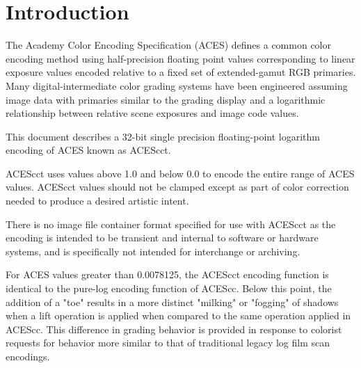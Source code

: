 \unnumberedformat	    %
\chapter{Introduction} 	%

The Academy Color Encoding Specification (ACES) defines a common color encoding method using half-precision floating point values corresponding to linear exposure values encoded relative to a fixed set of extended-gamut RGB primaries. Many digital-intermediate color grading systems have been engineered assuming image data with primaries similar to the grading display and a logarithmic relationship between relative scene exposures and image code values.

This document describes a 32-bit single precision floating-point logarithm encoding of ACES known as ACEScct.

ACEScct uses values above 1.0 and below 0.0 to encode the entire range of ACES values. ACEScct values should not be clamped except as part of color correction needed to produce a desired artistic intent.

There is no image file container format specified for use with ACEScct as the encoding is intended to be transient and internal to software or hardware systems, and is specifically not intended for interchange or archiving.

For ACES values greater than 0.0078125, the ACEScct encoding function is identical to the pure-log encoding function of ACEScc. Below this point, the addition of a "toe" results in a more distinct "milking" or "fogging" of shadows when a lift operation is applied when compared to the same operation applied in ACEScc. This difference in grading behavior is provided in response to colorist requests for behavior more similar to that of traditional legacy log film scan encodings. 